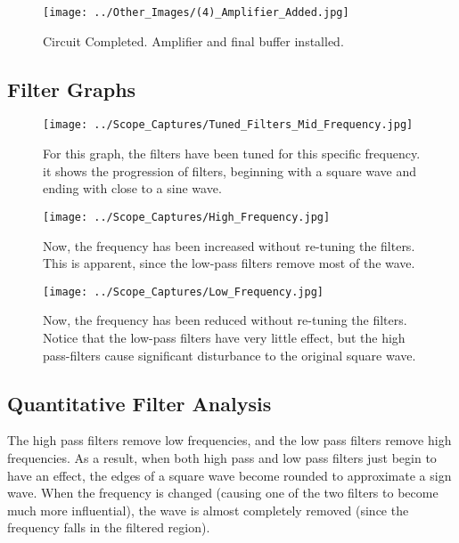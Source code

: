 \documentclass[11pt]{article} %
\begin{document}
\begin{figure} [H]
	\centering
	\texttt{[image: ../Other\_Images/(4)\_Amplifier\_Added.jpg]}
	\caption {Circuit Completed. Amplifier and final buffer installed.} %
	\label{fig:Amplifier_added} %
\end{figure}

\subsection{Filter Graphs}


\begin{figure} [H]
	\centering
	\texttt{[image: ../Scope\_Captures/Tuned\_Filters\_Mid\_Frequency.jpg]}
	\caption {For this graph, the filters have been tuned for this specific frequency. it shows the progression of filters, beginning with a square wave and ending with close to a sine wave.} %
	\label{fig:Mid_Frequency_Waveforms} %
\end{figure}

\begin{figure} [H]
	\centering
	\texttt{[image: ../Scope\_Captures/High\_Frequency.jpg]}
	\caption {Now, the frequency has been increased without re-tuning the filters. This is apparent, since the low-pass filters remove most of the wave.} %
	\label{fig:High_Frequency_Waveforms} %
\end{figure}

\begin{figure} [H]
	\centering
	\texttt{[image: ../Scope\_Captures/Low\_Frequency.jpg]}
	\caption {Now, the frequency has been reduced without re-tuning the filters. Notice that the low-pass filters have very little effect, but the high pass-filters cause significant disturbance to the original square wave.} %
	\label{fig:Low_Frequency_Waveforms} %
\end{figure}



\subsection{Quantitative Filter Analysis}
The high pass filters remove low frequencies, and the low pass filters remove high frequencies. As a result, when both high pass and low pass filters just begin to have an effect, the edges of a square wave become rounded to approximate a sign wave. When the frequency is changed (causing one of the two filters to become much more influential), the wave is almost completely removed (since the frequency falls in the filtered region).
\end{document}
